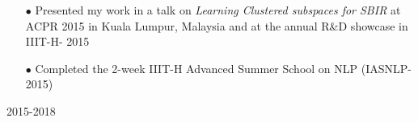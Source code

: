 \documentclass[letterpaper]{page3_formatting} %
\begin{document}
\begin{twenty}
{\begin{enumerate}
      \item[$\bullet$] Presented my work in a talk on \textit{Learning Clustered subspaces for SBIR} at ACPR 2015 in Kuala Lumpur, Malaysia and at the annual R\&D showcase in IIIT-H- 2015\vspace{0.05cm}
      \item[$\bullet$] Completed the 2-week IIIT-H Advanced Summer School on NLP (IASNLP-2015)
    \end{enumerate}
    }{2015-2018}\\
\end{twenty}


\end{document}
